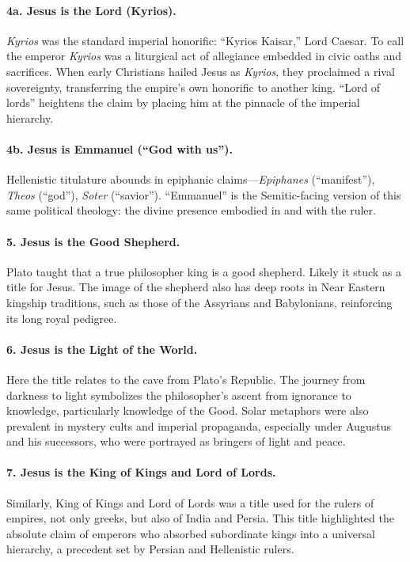 \paragraph{4a.
Jesus is the Lord (Kyrios).}\label{par:jesus-is-the-lord-kyrios}
\emph{Kyrios} was the standard imperial honorific: “Kyrios Kaisar,” Lord Caesar. To call the emperor \emph{Kyrios} was a liturgical act of allegiance embedded in civic oaths and sacrifices. When early Christians hailed Jesus as \emph{Kyrios}, they proclaimed a rival sovereignty, transferring the empire’s own honorific to another king. “Lord of lords” heightens the claim by placing him at the pinnacle of the imperial hierarchy.
\paragraph{4b.
Jesus is Emmanuel (“God with us”).}\label{par:jesus-is-emmanuel}
Hellenistic titulature abounds in epiphanic claims—\emph{Epiphanes} (“manifest”), \emph{Theos} (“god”), \emph{Soter} (“savior”).
“Emmanuel” is the Semitic-facing version of this same political theology: the divine presence embodied in and with the ruler.
\paragraph{5.
Jesus is the Good Shepherd.}\label{par:jesus-is-the-good-shepherd.}
Plato taught that a true philosopher king is a good shepherd.
Likely it stuck as a title for Jesus.
The image of the shepherd also has deep roots in Near Eastern kingship traditions, such as those of the Assyrians and Babylonians, reinforcing its long royal pedigree.

\paragraph{6.
Jesus is the Light of the World.}\label{par:jesus-is-the-light-of-the-world.}
Here the title relates to the cave from Plato’s Republic.
The journey from darkness to light symbolizes the philosopher’s ascent from ignorance to knowledge, particularly knowledge of the Good. Solar metaphors were also prevalent in mystery cults and imperial propaganda, especially under Augustus and his successors, who were portrayed as bringers of light and peace.
\paragraph{7.
Jesus is the King of Kings and Lord of Lords.}\label{par:jesus-is-the-king-of-kings-and-lord-of-lords.}
Similarly, King of Kings and Lord of Lords was a title used for the rulers of empires, not only greeks, but also of India and Persia. This title highlighted the absolute claim of emperors who absorbed subordinate kings into a universal hierarchy, a precedent set by Persian and Hellenistic rulers.
